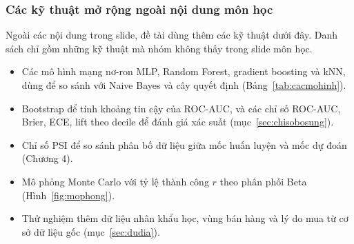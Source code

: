 \subsubsection{Các kỹ thuật mở rộng ngoài nội dung môn học}\label{sec:bonus}
Ngoài các nội dung trong slide, đề tài dùng thêm các kỹ thuật dưới đây. Danh sách chỉ gồm những kỹ thuật mà nhóm không thấy trong slide môn học.
\begin{itemize}
    \item Các mô hình mạng nơ-ron MLP, Random Forest, gradient boosting và kNN, dùng để so sánh với Naive Bayes và cây quyết định (Bảng~\ref{tab:cacmohinh}).
    \item Bootstrap để tính khoảng tin cậy của ROC-AUC, và các chỉ số ROC-AUC, Brier, ECE, lift theo decile để đánh giá xác suất (mục~\ref{sec:chisobosung}).
    \item Chỉ số PSI để so sánh phân bố dữ liệu giữa mốc huấn luyện và mốc dự đoán (Chương 4).
    \item Mô phỏng Monte Carlo với tỷ lệ thành công $r$ theo phân phối Beta (Hình~\ref{fig:mophong}).
    \item Thử nghiệm thêm dữ liệu nhân khẩu học, vùng bán hàng và lý do mua từ cơ sở dữ liệu gốc (mục~\ref{sec:dudia}).
\end{itemize}

